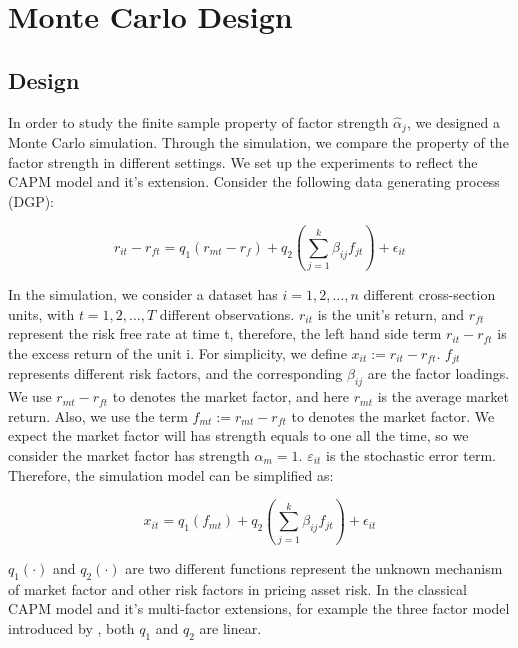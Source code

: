 
	\section{Monte Carlo Design}\label{MC}
	\subsection{Design}
In order to study the finite sample property of factor strength $\hat{\alpha}_j$, we designed a Monte Carlo simulation.
Through the simulation, we compare the property of the factor strength in different settings.
We set up the experiments to reflect the CAPM model and it's extension.
Consider the following data generating process (DGP):

	\[ r_{it} - r_{ft} = q_1({r_{mt}} - r_f) + q_2( \sum_{j=1}^k\beta_{ij}f_{jt}) +\epsilon_{it} \]


In the simulation, we consider a dataset has $i = 1, 2,\dots, n$ different cross-section units, with $t= 1, 2,\dots, T$ different observations. 
$r_{it}$ is the unit's return, and $r_{ft}$ represent the risk free rate at time t, therefore, the left hand side term $r_{it} - r_{ft}$ is the excess return of the unit i.
For simplicity, we define $x_{it} := r_{it}- r_{ft}$.
$f_{jt}$ represents different risk factors, and the corresponding  $\beta_{ij}$ are the factor loadings.
We use $r_{mt} - r_{ft}$ to denotes the market factor, and here $r_{mt}$ is the average market return.
Also, we use the term $f_{mt} := r_{mt} - r_{ft}$ to denotes the market factor.
We expect the market factor will has strength equals to one all the time, so we consider the market factor has strength $\alpha_m = 1$.
$\varepsilon_{it}$ is the stochastic error term.
Therefore, the simulation model can be simplified as:

\[ x_{it} = q_1(f_{mt}) + q_2( \sum_{j=1}^k\beta_{ij}f_{jt}) +\epsilon_{it}  \]

$q_1(\cdot)$ and $q_2(\cdot)$ are two different functions represent the unknown mechanism of market factor and other risk factors in pricing asset risk.
In the classical CAPM model and it's multi-factor extensions, for example the three factor model introduced by , both $q_1$ and $q_2$ are linear.

